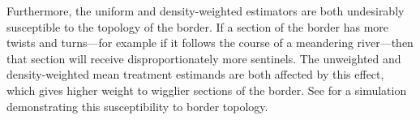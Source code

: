 Furthermore, the uniform and density-weighted estimators are both undesirably susceptible to the topology of the border.
If a section of the border has more twists and turns---for example if it follows the course of a meandering river---then that section will receive disproportionately more sentinels.
The unweighted and density-weighted mean treatment estimands are both affected by this effect,
which gives higher weight to wigglier sections of the border.
See \ofsupp{} for a simulation demonstrating this susceptibility to border topology.





